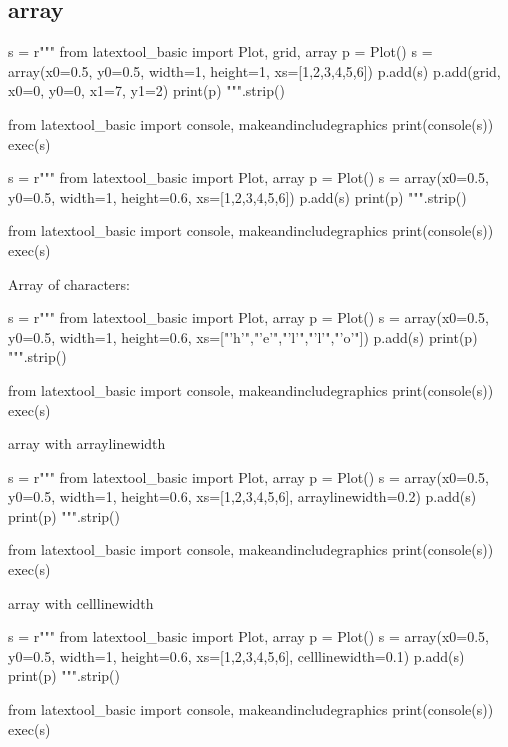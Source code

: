 \subsection{array}

\begin{python}
s = r"""
from latextool_basic import Plot, grid, array
p = Plot()
s = array(x0=0.5, y0=0.5, width=1, height=1, xs=[1,2,3,4,5,6])
p.add(s)
p.add(grid, x0=0, y0=0, x1=7, y1=2)
print(p)
""".strip()

from latextool_basic import console, makeandincludegraphics
print(console(s))
exec(s)
\end{python}



\newpage
\begin{python}
s = r"""
from latextool_basic import Plot, array
p = Plot()
s = array(x0=0.5, y0=0.5, width=1, height=0.6, xs=[1,2,3,4,5,6])
p.add(s)
print(p)
""".strip()

from latextool_basic import console, makeandincludegraphics
print(console(s))
exec(s)
\end{python}



\newpage
Array of characters:
\begin{python}
s = r"""
from latextool_basic import Plot, array
p = Plot()
s = array(x0=0.5, y0=0.5, width=1, height=0.6, 
          xs=["'h'","'e'","'l'","'l'","'o'"])
p.add(s)
print(p)
""".strip()

from latextool_basic import console, makeandincludegraphics
print(console(s))
exec(s)
\end{python}



\newpage
array with arraylinewidth
\begin{python}
s = r"""
from latextool_basic import Plot, array
p = Plot()
s = array(x0=0.5, y0=0.5, width=1, height=0.6, 
          xs=[1,2,3,4,5,6],
          arraylinewidth=0.2)
p.add(s)
print(p)
""".strip()

from latextool_basic import console, makeandincludegraphics
print(console(s))
exec(s)
\end{python}




\newpage
array with celllinewidth
\begin{python}
s = r"""
from latextool_basic import Plot, array
p = Plot()
s = array(x0=0.5, y0=0.5, width=1, height=0.6, 
          xs=[1,2,3,4,5,6],
          celllinewidth=0.1)
p.add(s)
print(p)
""".strip()

from latextool_basic import console, makeandincludegraphics
print(console(s))
exec(s)
\end{python}





